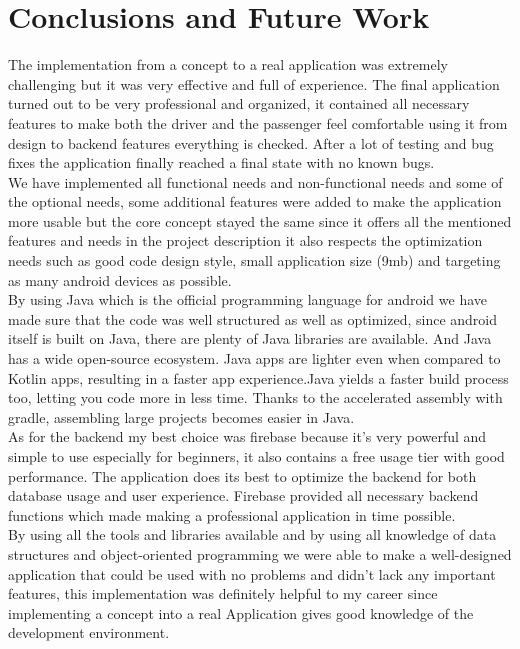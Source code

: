 \chapter{Conclusions and Future Work}\label{chap:conclusions}

The implementation from a concept to a real application was extremely challenging but it was very effective and full of experience. The final application turned out to be very professional and organized, it contained all necessary features to make both the driver and the passenger feel comfortable using it from design to backend features everything is checked. After a lot of testing and bug fixes the application finally reached a final state with no known bugs.\\

We have implemented all functional needs and non-functional needs and some of the optional needs, some additional features were added to make the application more usable but the core concept stayed the same since it offers all the mentioned features and needs in the project description it also respects the optimization needs such as good code design style, small application size (9mb) and targeting as many android devices as possible.\\

By using Java which is the official programming language for android we have made sure that the code was well structured as well as optimized, since android itself is built on Java, there are plenty of Java libraries are available. And Java has a wide open-source ecosystem. Java apps are lighter even when compared to Kotlin apps, resulting in a faster app experience.Java yields a faster build process too, letting you code more in less time. Thanks to the accelerated assembly with gradle, assembling large projects becomes easier in Java.\\

As for the backend my best choice was firebase because it’s very powerful and simple to use especially for beginners, it also contains a free usage tier with good performance. The application does its best to optimize the backend for both database usage and user experience. Firebase provided all necessary backend functions which made making a professional application in time possible.\\
 
By using all the tools and libraries available and by using all knowledge of data structures and object-oriented programming we were able to make a well-designed application that could be used with no problems and didn’t lack any important features, this implementation was definitely helpful to my career since implementing a concept into a real Application gives good knowledge of the development environment.

